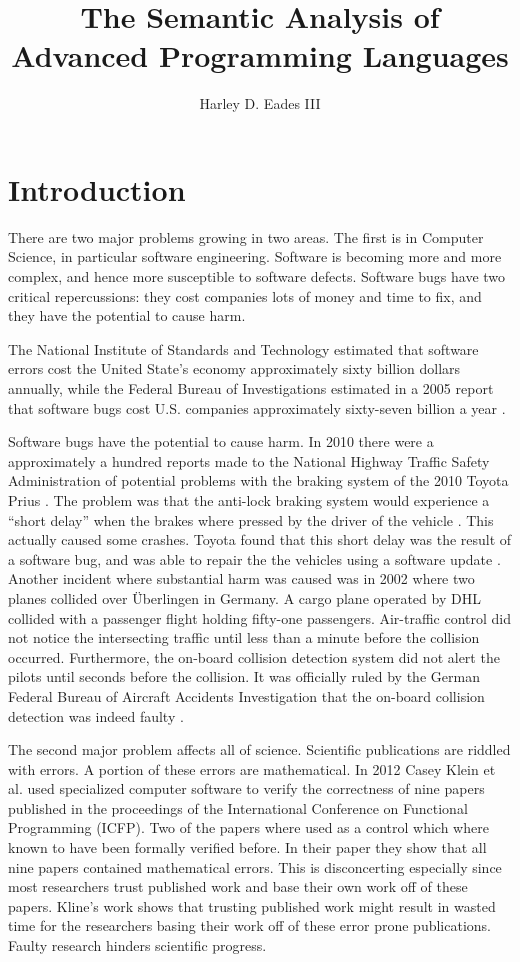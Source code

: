 \documentclass[phd,appendix,dedicationpage,ackpage,epigraphpage,figures]{uithesis}
\title{The Semantic Analysis of Advanced Programming Languages}
\author{Harley D. Eades III}
\begin{document}

\frontmatter

\chapter*{Introduction}
\label{sec:introduction}

There are two major problems growing in two areas.  The first is in
Computer Science, in particular software engineering. Software is
becoming more and more complex, and hence more susceptible to software
defects.  Software bugs have two critical repercussions: they cost
companies lots of money and time to fix, and they have the potential
to cause harm. 

The National Institute of Standards and Technology estimated that
software errors cost the United State's economy approximately sixty
billion dollars annually, while the Federal Bureau of Investigations
estimated in a 2005 report that software bugs cost U.S. companies
approximately sixty-seven billion a year \cite{nist02,fbi05}.

Software bugs have the potential to cause harm.  In 2010 there were a
approximately a hundred reports made to the National Highway Traffic
Safety Administration of potential problems with the braking system of
the 2010 Toyota Prius \cite{Consumer:2010}.  The problem was that the
anti-lock braking system would experience a ``short delay'' when
the brakes where pressed by the driver of the vehicle
\cite{thedetroitbureau.com:2009}.  This actually caused some crashes.
Toyota found that this short delay was the result of a software bug,
and was able to repair the the vehicles using a software update
\cite{Reuters:2009}.  Another incident where substantial harm was
caused was in 2002 where two planes collided over \"{U}berlingen in
Germany. A cargo plane operated by DHL collided with a passenger
flight holding fifty-one passengers.  Air-traffic control did not
notice the intersecting traffic until less than a minute before the
collision occurred.  Furthermore, the on-board collision detection
system did not alert the pilots until seconds before the collision.
It was officially ruled by the German Federal Bureau of Aircraft
Accidents Investigation that the on-board collision detection was
indeed faulty \cite{Collision:2004}.

The second major problem affects all of science.  Scientific
publications are riddled with errors.  A portion of these errors are
mathematical.  In 2012 Casey Klein et al. used specialized computer
software to verify the correctness of nine papers published in the
proceedings of the International Conference on Functional Programming
(ICFP).  Two of the papers where used as a control which where known
to have been formally verified before.  In their paper
\cite{Klein:2012} they show that all nine papers contained
mathematical errors.  This is disconcerting especially since most
researchers trust published work and base their own work off of these
papers.  Kline's work shows that trusting published work might result
in wasted time for the researchers basing their work off of these
error prone publications.  Faulty research hinders scientific
progress.
\end{document}
